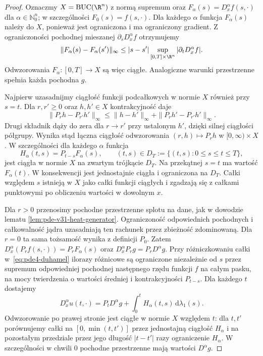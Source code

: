 \begin{proof}
Oznaczmy $X=\mathrm{BUC}(\R^n)$ z normą supremum
oraz $F_\alpha(s)=D_x^\alpha f(s,\cdot)$ dla
$\alpha\in\mathbb N_0^n$; w szczególności $F_0(s)=f(s,\cdot)$.
Dla każdego $\alpha$ funkcja $F_\alpha(s)$ należy do $X$,
ponieważ jest ograniczona i ma ograniczony gradient.
Z ograniczoności pochodnej mieszanej
$\partial_sD_x^\alpha f$ otrzymujemy
\[
 \|F_\alpha(s)-F_\alpha(s')\|_\infty
 \leq |s-s'|\sup_{[0,T]\times\R^n}
                  |\partial_tD_x^\alpha f|.
\]
Odwzorowania $F_\alpha:[0,T]\to X$ są więc ciągłe.
Analogiczne warunki przestrzenne spełnia każda
pochodna $g$.

Najpierw uzasadnijmy ciągłość funkcji podcałkowych
w normie $X$ również przy $s=t$. Dla $r,r'\geq0$
oraz $h,h'\in X$ kontrakcyjność daje
\[
 \|P_rh-P_{r'}h'\|_\infty
 \leq\|h-h'\|_\infty+\|P_rh'-P_{r'}h'\|_\infty.
\]
Drugi składnik dąży do zera dla $r\to r'$
przy ustalonym $h'$, dzięki silnej ciągłości półgrupy.
Wynika stąd łączna ciągłość odwzorowania
$(r,h)\mapsto P_rh$ w $[0,\infty)\times X$.
W szczególności dla każdego $\alpha$ funkcja
\[
 H_\alpha(t,s)=P_{t-s}F_\alpha(s),
 \qquad (t,s)\in D_T:=\{(t,s):0\leq s\leq t\leq T\},
\]
jest ciągła w normie $X$ na zwartym trójkącie $D_T$.
Na przekątnej $s=t$ ma wartość $F_\alpha(t)$.
W konsekwencji jest jednostajnie ciągła i ograniczona
na $D_T$. Całki względem $s$ istnieją w $X$ jako
całki funkcji ciągłych i zgadzają się z całkami
punktowymi po obliczeniu wartości w dowolnym $x$.

Dla $r>0$ przenosimy pochodne przestrzenne splotu
na dane, jak w dowodzie lematu
\ref{lem:pde-v31-heat-generator}. Ograniczoność
odpowiednich pochodnych i całkowalność jądra
uzasadniają ten rachunek przez zbieżność zdominowaną.
Dla $r=0$ ta sama tożsamość wynika z definicji $P_0$.
Zatem
$D_x^\alpha(P_rf(s,\cdot))=P_rF_\alpha(s)$
oraz $D_x^\alpha P_rg=P_rD^\alpha g$.
Przy różniczkowaniu całki w~\eqref{eq:pde4-duhamel}
ilorazy różnicowe są ograniczone niezależnie
od $s$ przez supremum odpowiedniej pochodnej
następnego rzędu funkcji $f$ na całym pasku,
na mocy twierdzenia o wartości średniej
i kontrakcyjności $P_{t-s}$.
Dla każdego $t$ dostajemy
\[
 D_x^\alpha u(t,\cdot)
 =P_tD^\alpha g+\int_0^t H_\alpha(t,s)\,
                       \mathrm d\lambda_1(s).
\]
Odwzorowanie po prawej stronie jest ciągłe
w normie $X$ względem $t$: dla $t,t'$ porównujemy
całki na $[0,\min(t,t')]$ przez jednostajną ciągłość
$H_\alpha$ i na pozostałym przedziale przez jego
długość $|t-t'|$ razy ograniczenie $H_\alpha$.
W szczególności w chwili $0$ pochodne przestrzenne
mają wartości $D^\alpha g$.


\end{proof}
